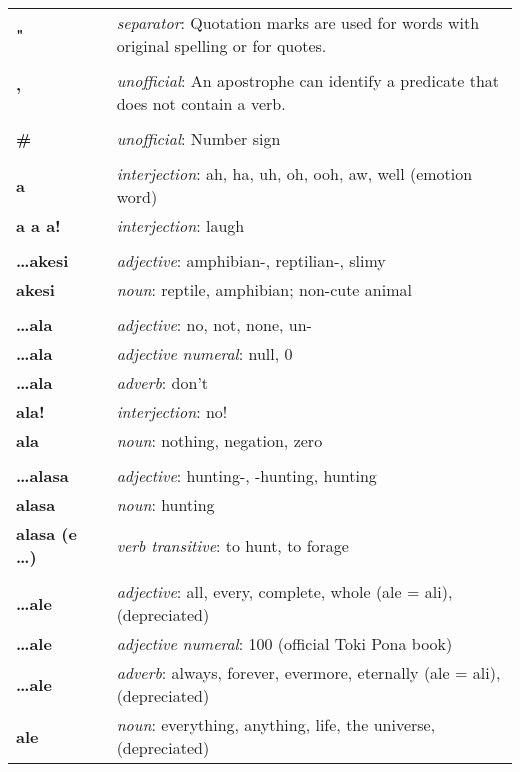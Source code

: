 \begin{supertabular}{p{2,5cm}|ll}
\textbf{"} && \textit{separator}: Quotation marks are used for words with original spelling or for quotes. \\ 
 && \\ %
\textbf{'} && \textit{unofficial}: An apostrophe can identify a predicate that does not contain a verb. \\ 
 && \\ %
\textbf{\#} && \textit{unofficial}: Number sign  \\ 
 && \\ %
\textbf{a} && \textit{interjection}: ah, ha, uh, oh, ooh, aw, well (emotion word) \\ 
\textbf{a a a!} && \textit{interjection}: laugh \\ 
 && \\ %
\textbf{\dots akesi} && \textit{adjective}: amphibian-, reptilian-, slimy \\ 
\textbf{akesi} && \textit{noun}: reptile, amphibian; non-cute animal \\ 
 && \\ %
\textbf{\dots ala} && \textit{adjective}: no, not, none, un- \\ 
\textbf{\dots ala} && \textit{adjective numeral}: null, 0 \\ 
\textbf{\dots ala} && \textit{adverb}: don't \\ 
\textbf{ala!} && \textit{interjection}: no! \\ 
\textbf{ala} && \textit{noun}: nothing, negation, zero \\ 
 && \\ %
\textbf{\dots alasa} && \textit{adjective}: hunting-, -hunting, hunting \\ 
\textbf{alasa} && \textit{noun}: hunting \\ 
\textbf{alasa (e \dots)} && \textit{verb transitive}: to hunt, to forage \\ 
 && \\ %
\textbf{\dots ale} && \textit{adjective}: all, every, complete, whole (ale = ali), (depreciated) \\ 
\textbf{\dots ale} && \textit{adjective numeral}: 100 (official Toki Pona book) \\ 
\textbf{\dots ale} && \textit{adverb}: always, forever, evermore, eternally (ale = ali), (depreciated) \\ 
\textbf{ale} && \textit{noun}: everything, anything, life, the universe, (depreciated) \\ 

\end{supertabular}
